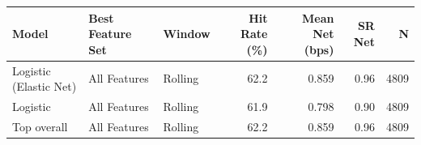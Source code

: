 \begin{tabular}{lllrrrr}
\toprule
Model & Best Feature Set & Window & Hit Rate (\%) & Mean Net (bps) & SR Net & N \\
\midrule
Logistic (Elastic Net) & All Features & Rolling & 62.2 & 0.859 & 0.96 & 4809 \\
Logistic & All Features & Rolling & 61.9 & 0.798 & 0.90 & 4809 \\
\midrule
Top overall & All Features & Rolling & 62.2 & 0.859 & 0.96 & 4809 \\
\bottomrule
\end{tabular}
